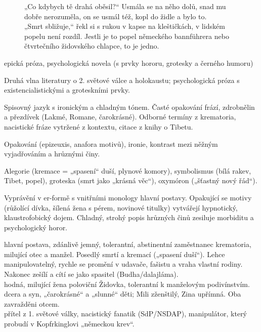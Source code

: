 \documentclass[FGBook.tex]{subfiles}
\begin{document}

\noindent\begin{figure}\footnotesize
{}
\setlength{\parindent}{3pt}
„Co kdybych tě drahá oběsil?“ Usmála se na něho dolů, snad mu dobře nerozuměla, on se usmál též, kopl do židle a bylo to.\\
„Smrt sbližuje,“ řekl si s rukou v kapse na kleštičkách, v lidském popelu není rozdíl. Jestli je to popel německého bannführera nebo čtvrtečního židovského chlapce, to je jedno.
\end{figure}


\noindent epická próza, psychologická novela (s prvky hororu, grotesky a černého humoru)

\noindent Druhá vlna literatury o 2. světové válce a holokaustu; psychologická próza s existencialistickými a groteskními prvky.

\noindent Spisovný jazyk s ironickým a chladným tónem. Časté opakování frází, zdrobnělin a přezdívek (Lakmé, Romane, čarokrásné). Odborné termíny z krematoria, nacistické fráze vytržené z kontextu, citace z knihy o Tibetu.

\noindent Opakování (epizeuxis, anafora motivů), ironie, kontrast mezi něžným vyjadřováním a hrůznými činy.

\noindent Alegorie (kremace = „spasení“ duší, plynové komory), symbolismus (bílá rakev, Tibet, popel), groteska (smrt jako „krásná věc“), oxymóron („šťastný nový řád“).

\noindent Vyprávění v er-formě s vnitřními monology hlavní postavy. Opakující se motivy (růžolící dívka, šílená žena s pérem, novinové titulky) vytvářejí hypnotický, klaustrofobický dojem. Chladný, strohý popis hrůzných činů zesiluje morbiditu a psychologický horor.

\noindent 
{} hlavní postava, zdánlivě jemný, tolerantní, abstinentní zaměstnanec krematoria, milující otec a manžel. Posedlý smrtí a kremací („spasení duší“). Lehce manipulovatelný, rychle se promění v udavače, fašistu a vraha vlastní rodiny. Nakonec zešílí a cítí se jako spasitel (Budha/dalajláma).\\
 hodná, milující žena poloviční Židovka, tolerantní k manželovým podivínstvím.\\
 dcera a syn, „čarokrásné“ a „slunné“ děti; Mili zženštilý, Zina upřímná. Oba zavražděni otcem.\\
 přítel z 1. světové války, nacistický fanatik (SdP/NSDAP), manipulátor, který probudí v Kopfrkinglovi „německou krev“.
\end{document}
